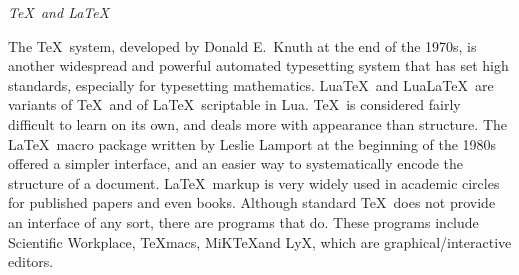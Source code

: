 \documentclass{slipbox}
\makeatletter
\def\subsection#1{\addvspace{\baselineskip}\noindent\textit{#1}\par\addvspace{\baselineskip}\@afterheading\@afterindentfalse}
\makeatother
\begin{document}
\begin{slip}
    \subsection{\TeX\ and \LaTeX}
    The \TeX\ system, developed by Donald E.\ Knuth at the end of the 1970s, is another widespread and powerful automated typesetting system that has set high standards, especially for typesetting mathematics. Lua\TeX\ and Lua\LaTeX\ are variants of \TeX\ and of \LaTeX\ scriptable in Lua. \TeX\ is considered fairly difficult to learn on its own, and deals more with appearance than structure. The \LaTeX\ macro package written by Leslie Lamport at the beginning of the 1980s offered a simpler interface, and an easier way to systematically encode the structure of a document. \LaTeX\ markup is very widely used in academic circles for published papers and even books. Although standard \TeX\ does not provide an interface of any sort, there are programs that do. These programs include Scientific Workplace, \TeX macs, MiK\TeX and LyX, which are graphical/interactive editors.
  \end{slip}
\end{document}

